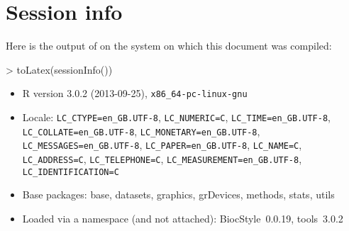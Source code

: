 \documentclass{article}
\begin{document}
\section{Session info}
Here is the output of  on the system on which
this document was compiled:
\begin{Schunk}
\begin{Sinput}
> toLatex(sessionInfo())
\end{Sinput}
\begin{itemize}\raggedright
  \item R version 3.0.2 (2013-09-25), \verb|x86_64-pc-linux-gnu|
  \item Locale: \verb|LC_CTYPE=en_GB.UTF-8|, \verb|LC_NUMERIC=C|, \verb|LC_TIME=en_GB.UTF-8|, \verb|LC_COLLATE=en_GB.UTF-8|, \verb|LC_MONETARY=en_GB.UTF-8|, \verb|LC_MESSAGES=en_GB.UTF-8|, \verb|LC_PAPER=en_GB.UTF-8|, \verb|LC_NAME=C|, \verb|LC_ADDRESS=C|, \verb|LC_TELEPHONE=C|, \verb|LC_MEASUREMENT=en_GB.UTF-8|, \verb|LC_IDENTIFICATION=C|
  \item Base packages: base, datasets, graphics, grDevices, methods, stats,
    utils
  \item Loaded via a namespace (and not attached): BiocStyle~0.0.19, tools~3.0.2
\end{itemize}\end{Schunk}


%
%



\end{document}
